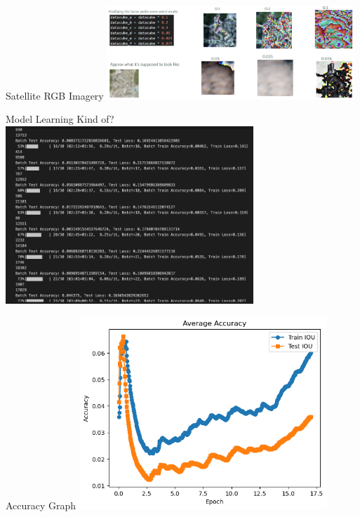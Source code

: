 \begin{frame}{Satellite RGB Imagery}
    \centering
    \includegraphics[height=0.7\textheight,width=0.7\textwidth,keepaspectratio]{images/mm-rgbsat.png}
\end{frame}

\begin{frame}{Model Learning Kind of?}
    \centering
    \includegraphics[height=0.7\textheight,width=0.7\textwidth,keepaspectratio]{images/train.png}
\end{frame}

\begin{frame}{Accuracy Graph}
    \centering
    \includegraphics[height=0.7\textheight,width=0.7\textwidth,keepaspectratio]{images/Average Accuracy.png}
\end{frame}
